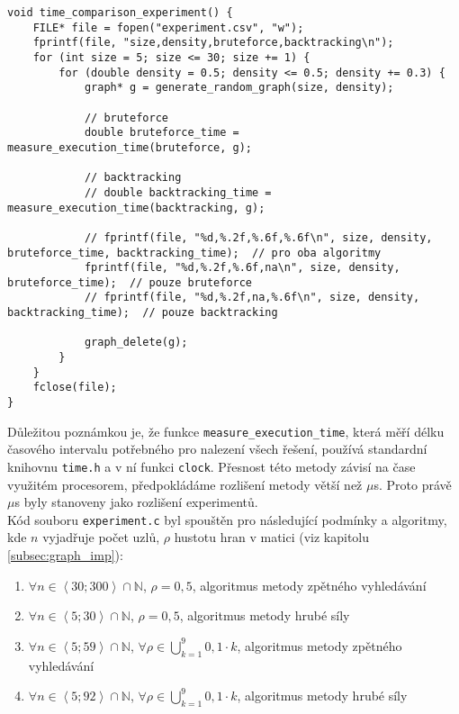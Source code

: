 \documentclass[a4paper]{article}
\begin{document}
    \begin{lstlisting}[caption={Zjednodušený kód hlavní funkce souboru \lstinline{experiment.c} nastavena pro generaci grafů velikosti 5 až 30 s hustotou 0,5 pro algoritmus metody hrubé síly.}, captionpos=b, label={code:experiment}]
void time_comparison_experiment() {
    FILE* file = fopen("experiment.csv", "w");
    fprintf(file, "size,density,bruteforce,backtracking\n");
    for (int size = 5; size <= 30; size += 1) { 
        for (double density = 0.5; density <= 0.5; density += 0.3) {
            graph* g = generate_random_graph(size, density);

            // bruteforce
            double bruteforce_time = measure_execution_time(bruteforce, g);

            // backtracking
            // double backtracking_time = measure_execution_time(backtracking, g);

            // fprintf(file, "%d,%.2f,%.6f,%.6f\n", size, density, bruteforce_time, backtracking_time);  // pro oba algoritmy
            fprintf(file, "%d,%.2f,%.6f,na\n", size, density, bruteforce_time);  // pouze bruteforce
            // fprintf(file, "%d,%.2f,na,%.6f\n", size, density, backtracking_time);  // pouze backtracking

            graph_delete(g);
        }
    }
    fclose(file);
}
    \end{lstlisting}

    \noindent
    Důležitou poznámkou je, že funkce \lstinline{measure_execution_time}, která měří délku časového intervalu potřebného pro nalezení všech řešení, používá standardní knihovnu \lstinline{time.h} a v ní funkci \lstinline{clock}. Přesnost této metody závisí na čase využitém procesorem, předpokládáme rozlišení metody větší než $\mu$s. Proto právě $\mu$s byly stanoveny jako rozlišení experimentů.\\

    \noindent
    Kód souboru \lstinline{experiment.c} byl spouštěn pro následující podmínky a algoritmy, kde $n$ vyjadřuje počet uzlů, $\rho$ hustotu hran v matici (viz kapitolu \ref{subsec:graph_imp}):
    \begin{enumerate}
        \item $\forall n \in \left<30;300\right> \cap \mathbb{N}$, $\rho = 0,5$, algoritmus metody zpětného vyhledávání
        \item $\forall n \in \left<5;30\right> \cap \mathbb{N}$, $\rho = 0,5$, algoritmus metody hrubé síly
        \item $\forall n \in \left<5;59\right> \cap \mathbb{N}$, $\forall \rho \in \bigcup_{k=1}^{9}0,1\cdot k$, algoritmus metody zpětného vyhledávání
        \item $\forall n \in \left<5;92\right> \cap \mathbb{N}$, $\forall \rho \in \bigcup_{k=1}^{9}0,1\cdot k$, algoritmus metody hrubé síly
    \end{enumerate}
\end{document}
